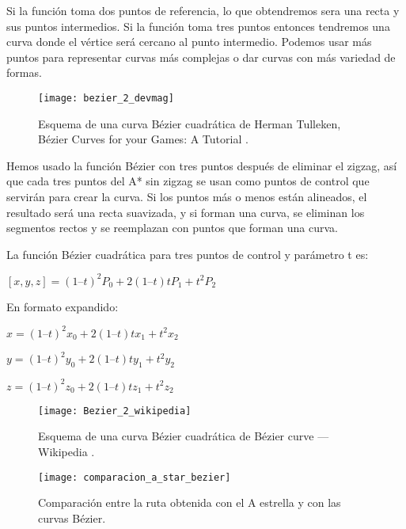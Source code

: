 Si la función toma dos puntos de referencia, lo que obtendremos sera una recta y sus puntos intermedios. Si la función toma tres puntos entonces tendremos una curva donde el vértice será cercano al punto intermedio. Podemos usar más puntos para representar curvas más complejas o dar curvas con más variedad de formas.

\begin{figure}[htpb]
    \centering
    \texttt{[image: bezier\_2\_devmag]}
    \caption[Esquema de una curva Bézier cuadrática de Herman Tulleken]{Esquema de una curva Bézier cuadrática de Herman Tulleken, Bézier Curves for your Games: A Tutorial \cite{bezierdevmag_imagen}.}
    \label{fig:basics AFM sketch}
\end{figure}

Hemos usado la función Bézier con tres puntos después de eliminar el zigzag, así que cada tres puntos del A* sin zigzag se usan como puntos de control que servirán para crear la curva. Si los puntos más o menos están alineados, el resultado será una recta suavizada, y si forman una curva, se eliminan los segmentos rectos y se reemplazan con puntos que forman una curva. 

La función Bézier cuadrática para tres puntos de control y parámetro t es:

\begin{center}
$[x, y, z] = (1 – t)^2P_0 + 2(1 – t)tP_1 + t^2P_2$
\end{center}

En formato expandido:
\begin{center}
$x = (1 – t)^2x_0 + 2(1 – t)tx_1 + t^2x_2$

$y = (1 – t)^2y_0 + 2(1 – t)ty_1 + t^2y_2$

$z = (1 – t)^2z_0 + 2(1 – t)tz_1 + t^2z_2$
\end{center}

\begin{figure}[htpb]
    \centering
    \texttt{[image: Bezier\_2\_wikipedia]}
    \caption[Esquema de una curva Bézier cuadrática, Wikipedia]{Esquema de una curva Bézier cuadrática de Bézier curve --- Wikipedia \cite{wiki:bezierimagen}.}
    \label{fig:basics AFM sketch}
\end{figure}

\begin{figure}[!htpb]
    \centering
    \texttt{[image: comparacion\_a\_star\_bezier]}
    \caption[Comparación entre la ruta obtenida con el A estrella y con las curvas Bézier.]{Comparación entre la ruta obtenida con el A estrella y con las curvas Bézier.}
    \label{fig:basics AFM sketch}
\end{figure}

